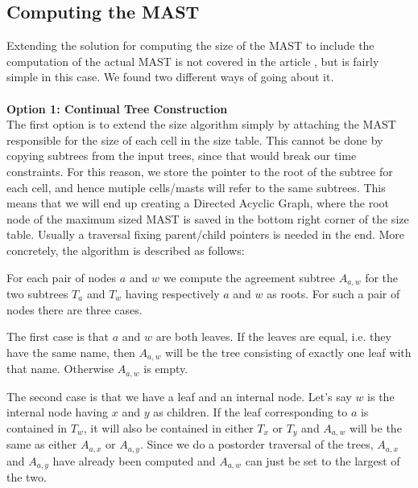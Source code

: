 \subsection{Computing the MAST}
Extending the solution for computing the size of the MAST to include the computation of the actual MAST is not covered in the article \cite{nsquared}, but is fairly simple in this case. We found two different ways of going about it. 
\\
\\
\textbf{Option 1: Continual Tree Construction} \\
The first option is to extend the size algorithm simply by attaching the MAST responsible for the size of each cell in the size table. This cannot be done by copying subtrees from the input trees, since that would break our time constraints. For this reason, we store the pointer to the root of the subtree for each cell, and hence mutiple cells/masts will refer to the same subtrees. This means that we will end up creating a Directed Acyclic Graph, where the root node of the maximum sized MAST is saved in the bottom right corner of the size table. Usually a traversal fixing parent/child pointers is needed in the end.
More concretely, the algorithm is described as follows: 

For each pair of nodes $a$ and $w$ we compute the agreement subtree $A_{a,w}$ for the two subtrees $T_a$ and $T_w$ having respectively $a$ and $w$ as roots. For such a pair of nodes there are three cases.

The first case is that $a$ and $w$ are both leaves. If the leaves are equal, i.e. they have the same name, then $A_{a,w}$ will be the tree consisting of exactly one leaf with that name. Otherwise $A_{a,w}$ is empty.

The second case is that we have a leaf and an internal node. Let's say $w$ is the internal node having $x$ and $y$ as children. If the leaf corresponding to $a$ is contained in $T_w$, it will also be contained in either $T_x$ or $T_y$ and $A_{a,w}$ will be the same as either $A_{a,x}$ or $A_{a,y}$. Since we do a postorder traversal of the trees, $A_{a,x}$ and $A_{a,y}$ have already been computed and $A_{a,w}$ can just be set to the largest of the two.

